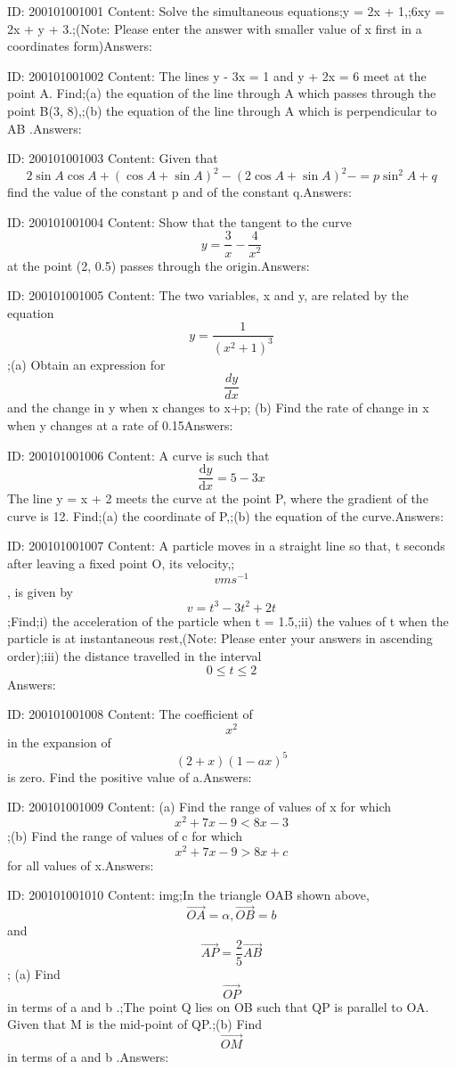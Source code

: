 \documentclass{article}
\begin{document}
ID: 200101001001
Content:
Solve the simultaneous equations;y = 2x + 1,;6xy = 2x + y + 3.;(Note: Please enter the answer with smaller value of x first in a coordinates form)Answers:

ID: 200101001002
Content:
The lines y - 3x = 1 and  y + 2x = 6 meet at the point A. Find;(a)	the equation of the line through A which passes through the point B(3, 8),;(b)	the equation of the line through A which is perpendicular to AB .Answers:

ID: 200101001003
Content:
Given that \[2\sin A\cos A+(\cos A+\sin A)^2-(2\cos A+\sin A)^2-=p \sin^2A+q\] find the value of the constant p and of the constant q.Answers:

ID: 200101001004
Content:
Show that the tangent to the curve \[y=\frac{3}{x}-\frac{4}{x^{2}}\] at the point (2, 0.5) passes through the origin.Answers:

ID: 200101001005
Content:
The two variables, x and y, are related by the equation \[y=\frac{1}{(x^2+1)^3}\];(a) Obtain an expression for $$\frac{dy}{dx}$$ and the change in y when x changes to x+p; (b) Find the rate of change in x when y changes at a rate of 0.15Answers:

ID: 200101001006
Content:
A curve is such that \[\frac{\mathrm{d} y}{\mathrm{d} x}=5-3x\]The line y = x + 2 meets the curve at the point P, where the gradient of the curve is 12. Find;(a)	the coordinate of P,;(b)	the equation of the curve.Answers:

ID: 200101001007
Content:
A particle moves in a straight line so that, t seconds after leaving a fixed point O, its velocity,; \[v ms^{-1}\], is given by \[v=t^3-3t^2+2t\];Find;i) the acceleration of the particle when t = 1.5,;ii) the values of t when the particle is at instantaneous rest,(Note: Please enter your answers in ascending order);iii) the distance travelled in the interval \[0\leq t\leq 2\]Answers:

ID: 200101001008
Content:
The coefficient of \[x^2\] in the expansion of \[(2+x)(1-ax)^5\] is zero. Find the positive value of a.Answers:

ID: 200101001009
Content:
(a) Find the range of values of x for which \[x^2+7x-9<8x-3\];(b) Find the range of values of c for which \[x^2+7x-9>8x+c\] for all values of x.Answers:

ID: 200101001010
Content:
img;In the triangle OAB shown above, \[\vec{OA}=\alpha,\vec{OB}=b\] and \[\vec{AP}=\frac{2}{5}\vec{AB}\]; (a) Find \[\vec{OP}\]in terms of a and b .;The point Q lies on OB such that QP is parallel to OA. Given that M is the mid-point of QP.;(b)	Find \[\vec{OM}\] in terms of a and b .Answers:
\end{document}
